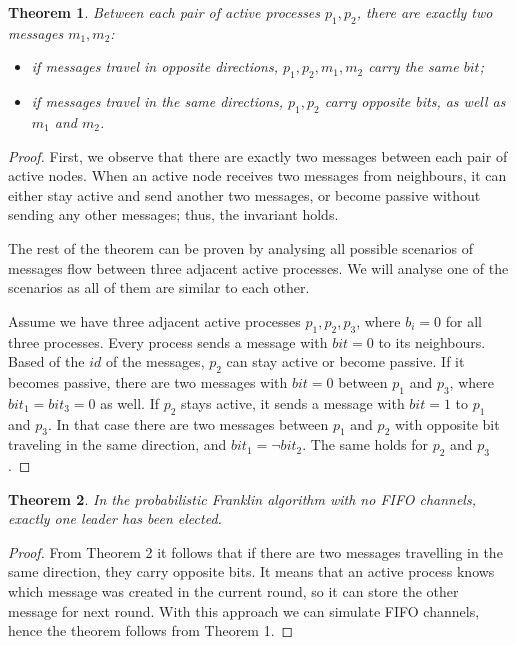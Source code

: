 \documentclass[a4paper,12pt]{article}
\newtheorem{theorem}{Theorem}
\begin{document}
\begin{theorem}
Between each pair of active processes $p_1, p_2$, there are exactly two messages $m_1, m_2$:
\begin{itemize}
    \itemsep0em 
    \item if messages travel in opposite directions, $p_1, p_2, m_1, m_2$ carry the same $bit$;
    \item if messages travel in the same directions, $p_1, p_2$ carry opposite bits, as well as $m_1$ and $m_2$.
\end{itemize}
\end{theorem}
\begin{proof}
First, we observe that there are exactly two messages between each pair of active nodes. When an active node receives two messages from neighbours, it can either stay active and send another two messages, or become passive without sending any other messages; thus, the invariant holds.

The rest of the theorem can be proven by analysing all possible scenarios of messages flow between three adjacent active processes. We will analyse one of the scenarios as all of them are similar to each other.

Assume we have three adjacent active processes $p_1, p_2, p_3$, where $b_i = 0$ for all three processes. Every process sends a message with $bit = 0$ to its neighbours. Based of the $id$ of the messages, $p_2$ can stay active or become passive. If it becomes passive, there are two messages with $bit = 0$ between $p_1$ and $p_3$, where $bit_1 = bit_3 = 0$ as well. If $p_2$ stays active, it sends a message with $bit = 1$ to $p_1$ and $p_3$. In that case there are two messages between $p_1$ and $p_2$ with opposite bit traveling in the same direction, and $bit_1 = \neg bit_2$. The same holds for $p_2$ and $p_3$.
\end{proof}

\begin{theorem}
    In the probabilistic Franklin algorithm with no FIFO channels, exactly one leader has been elected.
\end{theorem}
\begin{proof}
    From Theorem 2 it follows that if there are two messages travelling in the same direction, they carry opposite bits. It means that an active process knows which message was created in the current round, so it can store the other message for next round. With this approach we can simulate FIFO channels, hence the theorem follows from Theorem 1.
\end{proof}
\end{document}
